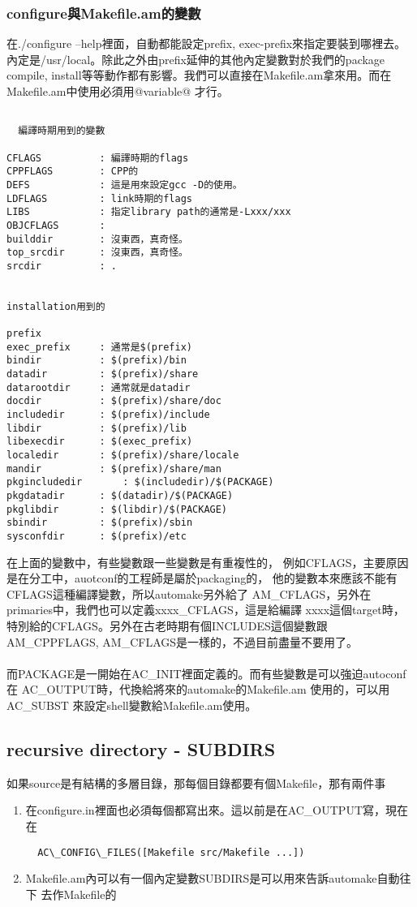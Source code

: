   \subsubsection{configure與Makefile.am的變數}
  在./configure --help裡面，自動都能設定prefix, exec-prefix來指定要裝到哪裡去。
  內定是/usr/local。除此之外由prefix延伸的其他內定變數對於我們的package 
  compile, install等等動作都有影響。我們可以直接在Makefile.am拿來用。而在
  Makefile.am中使用必須用@variable@ 才行。
  \begin{verbatim}

  編譯時期用到的變數
      
CFLAGS			: 編譯時期的flags
CPPFLAGS		: CPP的
DEFS			: 這是用來設定gcc -D的使用。
LDFLAGS			: link時期的flags
LIBS			: 指定library path的通常是-Lxxx/xxx
OBJCFLAGS		:
builddir		: 沒東西，真奇怪。
top_srcdir		: 沒東西，真奇怪。
srcdir			: .
      

installation用到的
      
prefix
exec_prefix		: 通常是$(prefix)
bindir			: $(prefix)/bin
datadir			: $(prefix)/share
datarootdir		: 通常就是datadir
docdir			: $(prefix)/share/doc
includedir		: $(prefix)/include
libdir			: $(prefix)/lib
libexecdir		: $(exec_prefix)
localedir		: $(prefix)/share/locale
mandir			: $(prefix)/share/man
pkgincludedir		: $(includedir)/$(PACKAGE)
pkgdatadir		: $(datadir)/$(PACKAGE)
pkglibdir		: $(libdir)/$(PACKAGE)
sbindir			: $(prefix)/sbin
sysconfdir		: $(prefix)/etc
  \end{verbatim}
  在上面的變數中，有些變數跟一些變數是有重複性的，
  例如CFLAGS，主要原因是在分工中，auotconf的工程師是屬於packaging的，
  他的變數本來應該不能有CFLAGS這種編譯變數，所以automake另外給了
  AM\_CFLAGS，另外在primaries中，我們也可以定義xxxx\_CFLAGS，這是給編譯
  xxxx這個target時，特別給的CFLAGS。另外在古老時期有個INCLUDES這個變數跟
  AM\_CPPFLAGS, AM\_CFLAGS是一樣的，不過目前盡量不要用了。
  \\\\
  而PACKAGE是一開始在AC\_INIT裡面定義的。而有些變數是可以強迫autoconf在
  AC\_OUTPUT時，代換給將來的automake的Makefile.am 使用的，可以用AC\_SUBST
  來設定shell變數給Makefile.am使用。
  \subsection{recursive directory - SUBDIRS}
  如果source是有結構的多層目錄，那每個目錄都要有個Makefile，那有兩件事
  \begin{enumerate}
    \item 在configure.in裡面也必須每個都寫出來。這以前是在AC\_OUTPUT寫，現在
     在
      \begin{verbatim}
  AC\_CONFIG\_FILES([Makefile src/Makefile ...])
      \end{verbatim}

   \item Makefile.am內可以有一個內定變數SUBDIRS是可以用來告訴automake自動往下
    去作Makefile的
  \end{enumerate}

